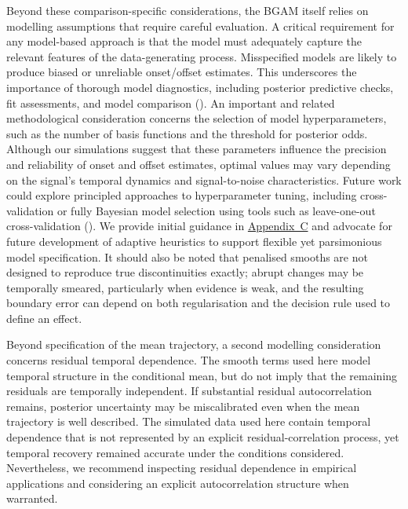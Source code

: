 \documentclass[
  doc,
  floatsintext,
  longtable,
  a4paper,
  nolmodern,
  notxfonts,
  notimes,
  colorlinks=true,linkcolor=blue,citecolor=blue,urlcolor=blue]{apa7}
\begin{document}
Beyond these comparison-specific considerations, the BGAM itself relies
on modelling assumptions that require careful evaluation. A critical
requirement for any model-based approach is that the model must
adequately capture the relevant features of the data-generating process.
Misspecified models are likely to produce biased or unreliable
onset/offset estimates. This underscores the importance of thorough
model diagnostics, including posterior predictive checks, fit
assessments, and model comparison (). An important and related methodological consideration
concerns the selection of model hyperparameters, such as the number of
basis functions and the threshold for posterior odds. Although our
simulations suggest that these parameters influence the precision and
reliability of onset and offset estimates, optimal values may vary
depending on the signal's temporal dynamics and signal-to-noise
characteristics. Future work could explore principled approaches to
hyperparameter tuning, including cross-validation or fully Bayesian
model selection using tools such as leave-one-out cross-validation
(). We provide initial
guidance in \hyperref[apx-basis]{Appendix~C} and advocate for future
development of adaptive heuristics to support flexible yet parsimonious
model specification. It should also be noted that penalised smooths are
not designed to reproduce true discontinuities exactly; abrupt changes
may be temporally smeared, particularly when evidence is weak, and the
resulting boundary error can depend on both regularisation and the
decision rule used to define an effect.

Beyond specification of the mean trajectory, a second modelling
consideration concerns residual temporal dependence. The smooth terms
used here model temporal structure in the conditional mean, but do not
imply that the remaining residuals are temporally independent. If
substantial residual autocorrelation remains, posterior uncertainty may
be miscalibrated even when the mean trajectory is well described. The
simulated data used here contain temporal dependence that is not
represented by an explicit residual-correlation process, yet temporal
recovery remained accurate under the conditions considered.
Nevertheless, we recommend inspecting residual dependence in empirical
applications and considering an explicit autocorrelation structure when
warranted.
\end{document}
